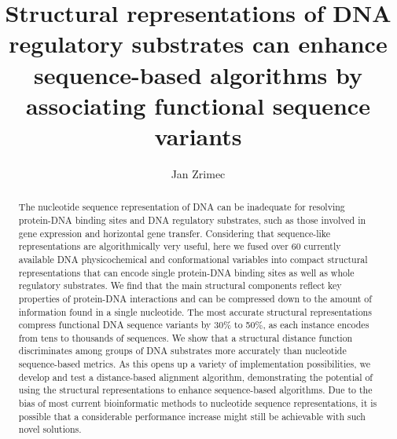 \documentclass[sigconf]{acmart}
\begin{document}
\title{Structural representations of DNA regulatory substrates can enhance sequence-based algorithms by associating functional sequence variants}

\author{Jan Zrimec}

\renewcommand{\shortauthors}{Zrimec J.}

\begin{abstract}
  The nucleotide sequence representation of DNA can be inadequate for resolving protein-DNA binding sites and DNA regulatory substrates, such as those involved in gene expression and horizontal gene transfer. Considering that sequence-like representations are algorithmically very useful, here we fused over 60 currently available DNA physicochemical and conformational variables into compact structural representations that can encode single protein-DNA binding sites as well as whole regulatory substrates. We find that the main structural components reflect key properties of protein-DNA interactions and can be compressed down to the amount of information found in a single nucleotide. The most accurate structural representations compress functional DNA sequence variants by 30\% to 50\%, as each instance encodes from tens to thousands of sequences. We show that a structural distance function discriminates among groups of DNA substrates more accurately than nucleotide sequence-based metrics. As this opens up a variety of implementation possibilities, we develop and test a distance-based alignment algorithm, demonstrating the potential of using the structural representations to enhance sequence-based algorithms. Due to the bias of most current bioinformatic methods to nucleotide sequence representations, it is possible that a considerable performance increase might still be achievable with such novel solutions.
\end{abstract}
\end{document}
